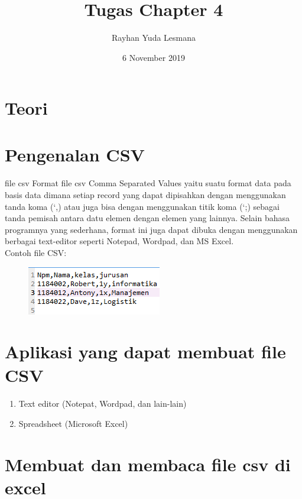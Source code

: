 \documentclass[a4paper,12pt]{report}
\title{Tugas Chapter 4}
\author{Rayhan Yuda Lesmana}
\date{6 November 2019}
\begin{document}
\maketitle


\section{Teori}
\section*{Pengenalan CSV}
\paragraph*{}
file csv Format file csv Comma Separated Values yaitu suatu
format data pada basis data dimana setiap record yang dapat dipisahkan dengan
menggunakan tanda koma (‘,) atau juga bisa dengan menggunakan titik
koma (‘;) sebagai tanda pemisah antara datu elemen dengan elemen yang
lainnya. Selain bahasa programnya yang sederhana, format ini juga dapat
dibuka dengan menggunakan berbagai text-editor seperti Notepad, Wordpad,
dan MS Excel.\\
Contoh file CSV:\\
\begin{figure}[h]
\includegraphics[scale=0.8]{gambar/1.png}
\end{figure}

\section*{Aplikasi yang dapat membuat file CSV}
\paragraph{}
\begin{enumerate}
\item Text editor (Notepat, Wordpad, dan lain-lain)
\item Spreadsheet (Microsoft Excel)
\end{enumerate}

\section*{Membuat dan membaca file csv di excel}
\end{document}
